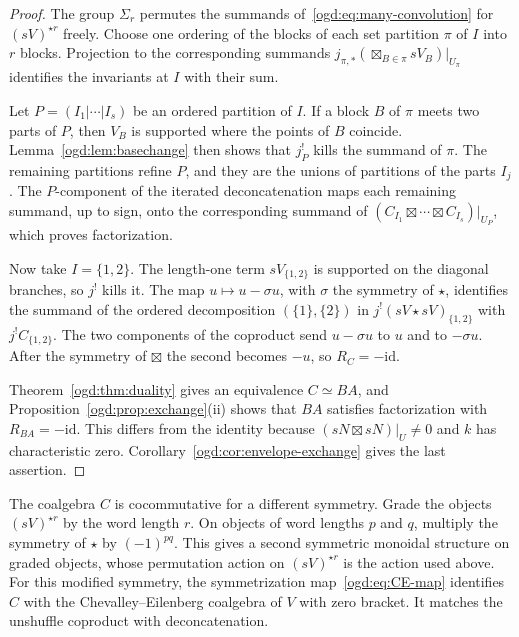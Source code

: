 \begin{proof}
The group \(\Sigma_r\) permutes the summands of~\eqref{ogd:eq:many-convolution} for \((sV)^{\star r}\) freely.
Choose one ordering of the blocks of each set partition \(\pi\) of \(I\) into \(r\) blocks.
Projection to the corresponding summands \(j_{\pi,*}(\boxtimes_{B\in\pi}sV_B)|_{U_\pi}\) identifies the invariants at \(I\) with their sum.

Let \(P=(I_1|\cdots|I_s)\) be an ordered partition of \(I\).
If a block \(B\) of \(\pi\) meets two parts of \(P\), then \(V_B\) is supported where the points of \(B\) coincide.
Lemma~\ref{ogd:lem:basechange} then shows that \(j_P^!\) kills the summand of \(\pi\).
The remaining partitions refine \(P\), and they are the unions of partitions of the parts \(I_j\).
The \(P\)-component of the iterated deconcatenation maps each remaining summand, up to sign, onto the corresponding summand of \((C_{I_1}\boxtimes\cdots\boxtimes C_{I_s})|_{U_P}\), which proves factorization.

Now take \(I=\{1,2\}\).
The length-one term \(sV_{\{1,2\}}\) is supported on the diagonal branches, so \(j^!\) kills it.
The map \(u\mapsto u-\sigma u\), with \(\sigma\) the symmetry of \(\star\), identifies the summand of the ordered decomposition \((\{1\},\{2\})\) in \(j^!(sV\star sV)_{\{1,2\}}\) with \(j^!C_{\{1,2\}}\).
The two components of the coproduct send \(u-\sigma u\) to \(u\) and to \(-\sigma u\).
After the symmetry of \(\boxtimes\) the second becomes \(-u\), so \(R_C=-\mathrm{id}\).

Theorem~\ref{ogd:thm:duality} gives an equivalence \(C\simeq BA\), and Proposition~\ref{ogd:prop:exchange}(ii) shows that \(BA\) satisfies factorization with \(R_{BA}=-\mathrm{id}\).
This differs from the identity because \((sN\boxtimes sN)|_U\ne0\) and \(k\) has characteristic zero.
Corollary~\ref{ogd:cor:envelope-exchange} gives the last assertion.
\end{proof}

The coalgebra \(C\) is cocommutative for a different symmetry.
Grade the objects \((sV)^{\star r}\) by the word length \(r\).
On objects of word lengths \(p\) and \(q\), multiply the symmetry of \(\star\) by \((-1)^{pq}\).
This gives a second symmetric monoidal structure on graded objects, whose permutation action on \((sV)^{\star r}\) is the action used above.
For this modified symmetry, the symmetrization map~\eqref{ogd:eq:CE-map} identifies \(C\) with the Chevalley--Eilenberg coalgebra of \(V\) with zero bracket.
It matches the unshuffle coproduct with deconcatenation.

